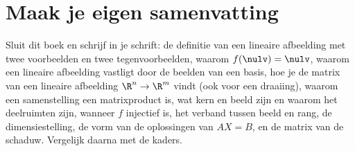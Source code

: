 
\begin{oefeningen}






\end{oefeningen}


\ifzelfstudie
\section*{Maak je eigen samenvatting}
Sluit dit boek en schrijf in je schrift: de definitie van een lineaire afbeelding met twee voorbeelden en twee tegenvoorbeelden, waarom $f(\nulv) = \nulv$, waarom een lineaire afbeelding vastligt door de beelden van een basis, hoe je de matrix van een lineaire afbeelding $\R^n \to \R^m$ vindt (ook voor een draaiing), waarom een samenstelling een matrixproduct is, wat kern en beeld zijn en waarom het deelruimten zijn, wanneer $f$ injectief is, het verband tussen beeld en rang, de dimensiestelling, de vorm van de oplossingen van $AX = B$, en de matrix van de schaduw. Vergelijk daarna met de kaders.
\fi
